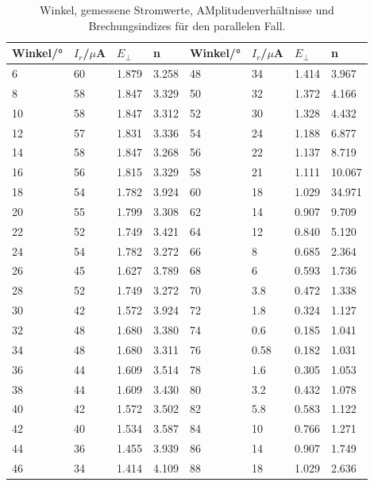 \begin{table}[H]
  \centering
  \caption{Winkel, gemessene Stromwerte, AMplitudenverhältnisse und Brechungsindizes für den parallelen Fall.}
  \begin{tabular}{l|l|l|l|l|l|l|l}
  Winkel/° & $I_r$/$\mu$A & $E_\bot$ & n & Winkel/° & $I_r$/$\mu$A & $E_\bot$ & n\\\hline
  6 & 60 & 1.879 & 3.258 & 48 & 34 & 1.414 & 3.967\\
  8 & 58 & 1.847 & 3.329 & 50 & 32 & 1.372 & 4.166\\
  10 & 58 & 1.847 & 3.312 & 52 & 30 & 1.328 & 4.432\\
  12 & 57 & 1.831 & 3.336 & 54 & 24 & 1.188 & 6.877\\
  14 & 58 & 1.847 & 3.268 & 56 & 22 & 1.137 & 8.719\\
  16 & 56 & 1.815 & 3.329 & 58 & 21 & 1.111 & 10.067\\
  18 & 54 & 1.782 & 3.924 & 60 & 18 & 1.029 & 34.971\\
  20 & 55 & 1.799 & 3.308 & 62 & 14 & 0.907 & 9.709\\
  22 & 52 & 1.749 & 3.421 & 64 & 12 & 0.840 & 5.120\\
  24 & 54 & 1.782 & 3.272 & 66 & 8 & 0.685 & 2.364\\
  26 & 45 & 1.627 & 3.789 & 68 & 6 & 0.593 & 1.736\\
  28 & 52 & 1.749 & 3.272 & 70 & 3.8 & 0.472 & 1.338\\
  30 & 42 & 1.572 & 3.924 & 72 & 1.8 & 0.324 & 1.127\\
  32 & 48 & 1.680 & 3.380 & 74 & 0.6 & 0.185 & 1.041\\
  34 & 48 & 1.680 & 3.311 & 76 & 0.58 & 0.182 & 1.031\\
  36 & 44 & 1.609 & 3.514 & 78 & 1.6 & 0.305 & 1.053\\
  38 & 44 & 1.609 & 3.430 & 80 & 3.2 & 0.432 & 1.078\\
  40 & 42 & 1.572 & 3.502 & 82 & 5.8 & 0.583 & 1.122\\
  42 & 40 & 1.534 & 3.587 & 84 & 10 & 0.766 & 1.271\\
  44 & 36 & 1.455 & 3.939 & 86 & 14 & 0.907 & 1.749\\
  46 & 34 & 1.414 & 4.109 & 88 & 18 & 1.029 & 2.636\\\hline
  \end{tabular}
  \label{i2}
\end{table}

